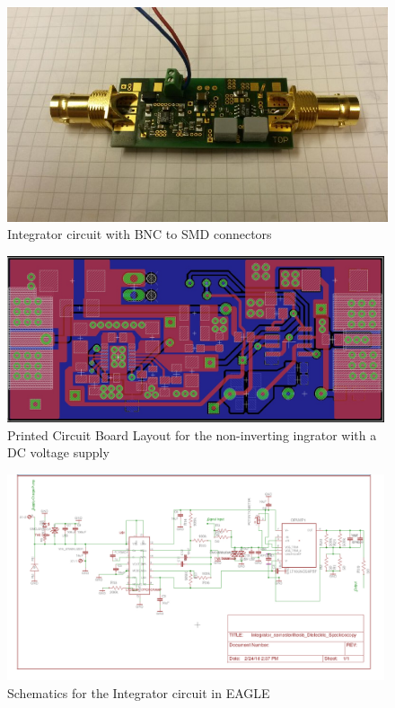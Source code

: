 \begin{figure}[H]
\includegraphics[width=\textwidth]{figures/Method/integrator/realintegrator.jpg}
\caption[Kurze Abbildungsbeschreibung]{Integrator circuit with BNC to SMD connectors}
\label{fig.realcircuit}
\end{figure}
\begin{figure}
\includegraphics[width=0.99\textwidth]{figures/Method/integrator/PCB_Integrator.png}
    \caption{Printed Circuit Board Layout for the non-inverting ingrator with a DC voltage supply} 
    \label{fig.solder}
\end{figure}

    
    
    
\begin{figure}
\includegraphics[width=0.99\textwidth]{figures/Method/integrator/schematic.jpg}
 \caption{Schematics for the Integrator circuit in EAGLE}
 \end{figure}


